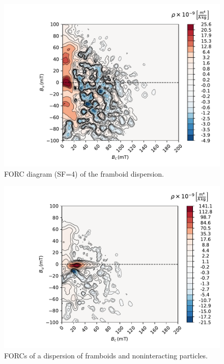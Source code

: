 \begin{figure}
\centering
\includegraphics[width=\textwidth]{research-4/figs/FORC_framAVG_SF4.pdf}
\caption[FORC diagram of the framboid dispersion]{FORC diagram (SF=4) of the framboid dispersion.}
\label{FIG_11}
\end{figure}

\begin{figure}
\centering
\includegraphics[width=\textwidth]{research-4/figs/FORC_framAVG_SF4_mixed_SD_ratio1.pdf}
\caption[FORCs of a dispersion of framboids and noninteracting SD particles]{FORCs of a dispersion of framboids and noninteracting particles.}
\label{FIG_12}
\end{figure}

